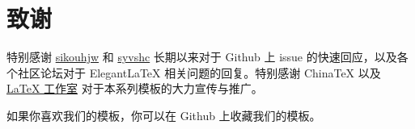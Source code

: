 \documentclass[lang=cn,a4paper,newtx]{elegantpaper}
\begin{document}
\section{致谢}

特别感谢 \href{https://github.com/sikouhjw}{sikouhjw} 和 \href{https://github.com/syvshc}{syvshc}  长期以来对于 Github 上 issue 的快速回应，以及各个社区论坛对于 ElegantLaTeX 相关问题的回复。特别感谢 ChinaTeX 以及 \href{http://www.latexstudio.net/}{LaTeX 工作室} 对于本系列模板的大力宣传与推广。

如果你喜欢我们的模板，你可以在 Github 上收藏我们的模板。

\nocite{*}
\printbibliography[heading=bibintoc, title=\ebibname]

\appendix
\addappheadtotoc
\end{document}
